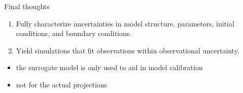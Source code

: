 \documentclass[hide notes,intlimits]{beamer}
\begin{document}
\begin{frame}{Final thoughts}
  \begin{enumerate}
  \item Fully characterize uncertainties in model structure, \alert{parameters}, initial conditions, and boundary conditions.
  \item \alert{Yield simulations that fit observations within observational uncertainty.}
  \end{enumerate}
  \begin{itemize}
  \item the surrogate model is only used to aid in model calibration
  \item \alert{not} for the actual projections
  \end{itemize}
\end{frame}
\end{document}
